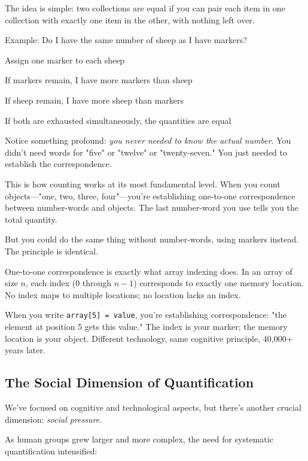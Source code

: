 The idea is simple: two collections are equal if you can pair each item in one collection with exactly one item in the other, with nothing left over.

Example: Do I have the same number of sheep as I have markers?
\begin{compactitem}
	\item Assign one marker to each sheep
	\item If markers remain, I have more markers than sheep
	\item If sheep remain, I have more sheep than markers
	\item If both are exhausted simultaneously, the quantities are equal
\end{compactitem}

Notice something profound: \textit{you never needed to know the actual number}. You didn't need words for "five" or "twelve" or "twenty-seven." You just needed to establish the correspondence.

This is how counting works at its most fundamental level. When you count objects—"one, two, three, four"—you're establishing one-to-one correspondence between number-words and objects. The last number-word you use tells you the total quantity.

But you could do the same thing without number-words, using markers instead. The principle is identical.

\begin{connection}
	One-to-one correspondence is exactly what array indexing does. In an array of size $n$, each index (0 through $n-1$) corresponds to exactly one memory location. No index maps to multiple locations; no location lacks an index.
	
	When you write \texttt{array[5] = value}, you're establishing correspondence: "the element at position 5 gets this value." The index is your marker; the memory location is your object. Different technology, same cognitive principle, 40,000+ years later.
\end{connection}

\subsection{The Social Dimension of Quantification}

We've focused on cognitive and technological aspects, but there's another crucial dimension: \textit{social pressure}.

As human groups grew larger and more complex, the need for systematic quantification intensified:

